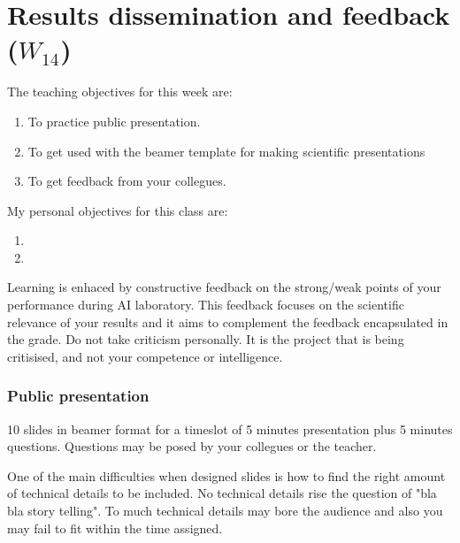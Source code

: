 \documentclass[a4paper,12pt]{report}
\begin{document}
\vspace{0.5cm}

\vspace{0.5cm}


\chapter{Results dissemination and feedback ($W_{14}$)}

The teaching objectives for this week are:
\begin{enumerate}
\item To practice public presentation.
\item To get used with the beamer template for making scientific presentations
 \item To get feedback from your collegues. 
\end{enumerate}

\vspace{0.5cm}

My personal objectives for this class are:
\begin{enumerate}
 \item 
 \item 
\end{enumerate}

Learning is enhaced by constructive feedback on the strong/weak points of your performance during AI laboratory. 
This feedback focuses on the scientific relevance of your results and it aims to complement the feedback encapsulated in the grade.
Do not take criticism personally. 
It is the project that is being critisised, and not your competence or intelligence. 


\subsection{Public presentation}
10 slides in beamer format for a timeslot of 5 minutes presentation plus 5 minutes questions.
Questions may be posed by your collegues or the teacher. 

One of the main difficulties when designed slides is how to find the right amount of 
technical details to be included. 
No technical details rise the question of "bla bla story telling". 
To much technical details may bore the audience and also you may fail to fit within the time assigned. 
\end{document}
